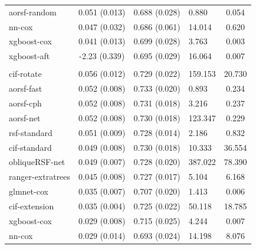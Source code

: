 \documentclass[twoside,11pt]{article}\usepackage[]{graphicx}\usepackage[]{xcolor}
\newenvironment{knitrout}{}{} %
\begin{document}
\begin{knitrout}
\begin{longtable}[t]{lcclc}
\hspace{1em}aorsf-random & 0.051 (0.013) & 0.688 (0.028) & 0.880 & 0.054\\
\hspace{1em}nn-cox & 0.047 (0.032) & 0.686 (0.061) & 14.014 & 0.620\\
\hspace{1em}xgboost-cox & 0.041 (0.013) & 0.699 (0.028) & 3.763 & 0.003\\
\hspace{1em}xgboost-aft & -2.23 (0.339) & 0.695 (0.029) & 16.064 & 0.007\\
\addlinespace[0.3em]
\hline
\multicolumn{5}{l}{\textit{\textbf{Heart Transplant; graft-loss or death, n = 3787, p = 52}}}\\
\hline
\hspace{1em}cif-rotate & 0.056 (0.012) & 0.729 (0.022) & 159.153 & 20.730\\
\hspace{1em}aorsf-fast & 0.052 (0.008) & 0.733 (0.020) & 0.893 & 0.234\\
\hspace{1em}aorsf-cph & 0.052 (0.008) & 0.731 (0.018) & 3.216 & 0.237\\
\hspace{1em}aorsf-net & 0.052 (0.008) & 0.730 (0.018) & 123.347 & 0.229\\
\hspace{1em}rsf-standard & 0.051 (0.009) & 0.728 (0.014) & 2.186 & 0.832\\
\hspace{1em}cif-standard & 0.049 (0.008) & 0.730 (0.018) & 10.333 & 36.554\\
\hspace{1em}obliqueRSF-net & 0.049 (0.007) & 0.728 (0.020) & 387.022 & 78.390\\
\hspace{1em}ranger-extratrees & 0.045 (0.008) & 0.727 (0.017) & 5.104 & 6.168\\
\hspace{1em}glmnet-cox & 0.035 (0.007) & 0.707 (0.020) & 1.413 & 0.006\\
\hspace{1em}cif-extension & 0.035 (0.004) & 0.725 (0.022) & 50.118 & 18.785\\
\hspace{1em}xgboost-cox & 0.029 (0.008) & 0.715 (0.025) & 4.244 & 0.007\\
\hspace{1em}nn-cox & 0.029 (0.014) & 0.693 (0.024) & 14.198 & 8.076\\

\end{longtable}
\end{knitrout}
\end{document}
